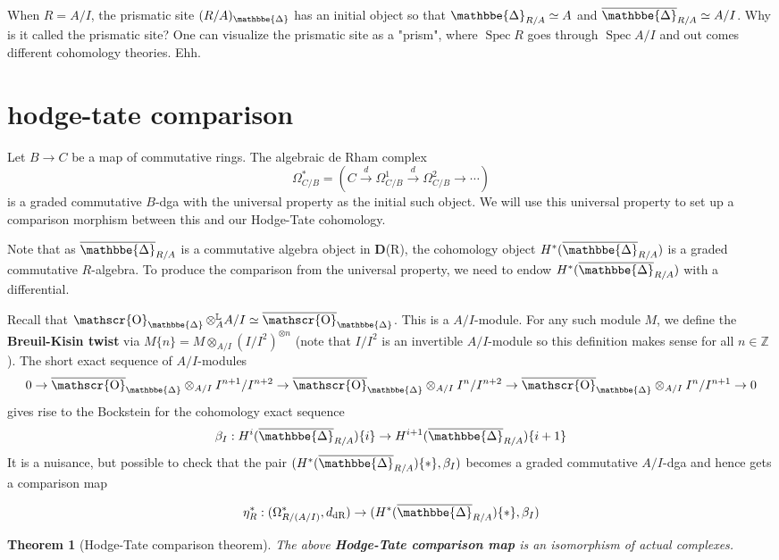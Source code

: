 \documentclass[12pt]{amsproc}
\newtheorem*{thm}{Theorem}
\theoremstyle{definition}
\newcommand{\Z}{\mathbb{Z}}
\newcommand{\tensor}{\otimes}
\newcommand{\htpyeq}{\simeq}
\newcommand{\ra}{\rightarrow}
\newcommand{\xra}{\xrightarrow}
\DeclareMathOperator{\Spec}{Spec}
\DeclareMathOperator{\prism}{\mathbbe{\Delta}}
\DeclareMathOperator{\Oh}{\mathscr{O}}
\DeclareMathOperator{\DerivedL}{\mathbb{L}}
\begin{document}
When $R=A/I$, the prismatic site $(R/A)_{\prism}$ has an initial object so that $\prism_{R/A}\htpyeq A$ and $\overline{\prism}_{R/A}\htpyeq A/I$. Why is it called the prismatic site? One can visualize the prismatic site as a "prism", where $\Spec R$ goes through $\Spec A/I$ and out comes different cohomology theories. Ehh.

\section{hodge-tate comparison}

Let $B\ra C$ be a map of commutative rings. The algebraic de Rham complex
\[	\Omega^*_{C/B}=(C\xra{d} \Omega^1_{C/B}\xra{d}\Omega^2_{C/B}\ra\cdots)	\]
is a graded commutative $B$-dga with the universal property as the initial such object. We will use this universal property to set up a comparison morphism between this and our Hodge-Tate cohomology.

Note that as $\overline{\prism}_{R/A}$ is a commutative algebra object in $\mathbf{D}$(R), the cohomology object $H^*(\overline{\prism}_{R/A})$ is a graded commutative $R$-algebra. To produce the comparison from the universal property, we need to endow $H^*(\overline{\prism}_{R/A})$ with a differential.

Recall that $\Oh_{\prism}\tensor^{\DerivedL}_A A/I\htpyeq \overline{\Oh}_{\prism}$. This is a $A/I$-module. For any such module $M$, we define the \textbf{Breuil-Kisin twist} via $M\{n\}=M\tensor_{A/I}(I/I^2)^{\otimes n}$ (note that $I/I^2$ is an invertible $A/I$-module so this definition makes sense for all $n\in\Z$). The short exact sequence of $A/I$-modules
\[	0\ra \overline{\Oh}_{\prism}\tensor_{A/I}I^{n+1}/I^{n+2}\ra \overline{\Oh}_{\prism}\tensor_{A/I}I^{n}/I^{n+2}\ra 
	\overline{\Oh}_{\prism}\tensor_{A/I}I^{n}/I^{n+1}\ra 0	\]
gives rise to the Bockstein for the cohomology exact sequence
\[	\beta_I: H^i(\overline{\prism}_{R/A})\{i\}\ra H^{i+1}(\overline{\prism}_{R/A})\{i+1\}	\]
It is a nuisance, but possible to check that the pair $(H^*(\overline{\prism}_{R/A})\{*\}, \beta_I)$ becomes a graded commutative $A/I$-dga and hence gets a comparison map

\[ \eta_R^*:(\Omega^*_{R/(A/I)}, d_{\text{dR}})\ra (H^*(\overline{\prism}_{R/A})\{*\}, \beta_I)	\]

\begin{thm}[Hodge-Tate comparison theorem] The above \textbf{Hodge-Tate comparison map} is an isomorphism of actual complexes.
\end{thm}
\end{document}
